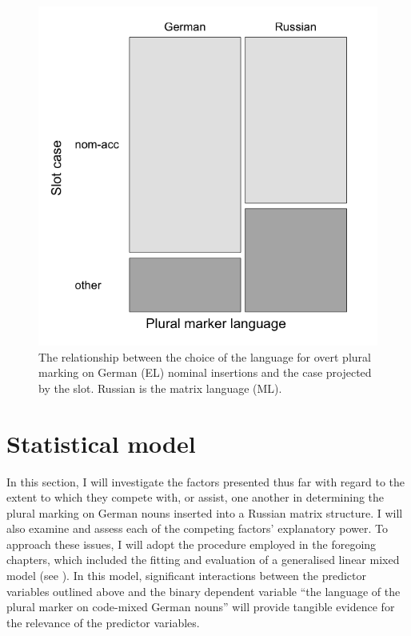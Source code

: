 \begin{figure}
\includegraphics[scale=0.5]{figures/6-Figure_4.png}
\caption{The relationship between the choice of the language for overt plural marking on German (EL) nominal insertions and the case projected by the slot. Russian is the matrix language (ML).\label{fig:6:4}}
\end{figure}

\section{Statistical model}\label{stat}

In this section, I will investigate the factors presented thus far with regard to the extent to which they compete with, or assist, one another in determining the plural marking on German nouns inserted into a Russian matrix structure. I will also examine and assess each of the competing factors’ explanatory power. To approach these issues, I will adopt the procedure employed in the foregoing chapters, which included the fitting and evaluation of a generalised linear mixed model (see \citealt[278--284]{baayen-analyzing}). In this model, significant interactions between the predictor variables outlined above and the binary dependent variable “the language of the plural marker on code-mixed German nouns” will provide tangible evidence for the relevance of the predictor variables.

